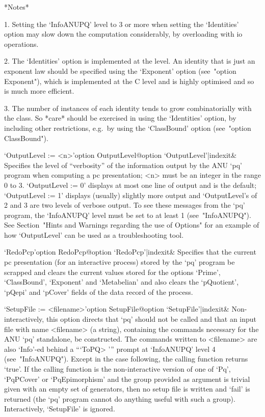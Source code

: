 *Notes*

\beginlist%

\item{1.}
Setting the `InfoANUPQ' level to 3 or more when setting the  `Identities'
option may slow down the computation considerably, by overloading  {\GAP}
with io operations.

\item{2.}
The `Identities' option is implemented at the {\GAP} level.  An  identity
that is just an exponent law should be  specified  using  the  `Exponent'
option (see~"option Exponent"), which is implemented at the C  level  and
is highly optimised and so is much more efficient.

\item{3.}
The  number  of   instances  of  each  identity   tends  to  grow
combinatorially with the class. So *care* should be exercised in using
the  `Identities'  option, by  including  other restrictions,  e.g.~by
using the `ClassBound' option (see~"option ClassBound").

\endlist

\>`OutputLevel := <n>'{option OutputLevel}@{option `OutputLevel'|indexit}&
Specifies the level of ``verbosity'' of the information output by the ANU
`pq' program when computing a pc presentation; <n> must be an integer  in
the range 0 to 3. `OutputLevel := 0' displays at most one line of  output
and is the default; `OutputLevel := 1' displays (usually)  slightly  more
output and `OutputLevel's of 2 and 3 are two levels of verbose output. To
see these messages from the `pq' program, the `InfoANUPQ' level  must  be
set to at least 1  (see~"InfoANUPQ").  See  Section~"Hints  and  Warnings
regarding the use of Options" for an example of how `OutputLevel' can  be
used as a troubleshooting tool.

\>`RedoPcp'{option RedoPcp}@{option `RedoPcp'|indexit}&
Specifies that the current pc presentation (for an  interactive  process)
stored by the `pq' program be scrapped  and  clears  the  current  values
stored for the options `Prime', `ClassBound', `Exponent' and `Metabelian'
and also clears the `pQuotient', `pQepi' and `pCover' fields of the  data
record of the process.

\>`SetupFile := <filename>'{option SetupFile}@{option `SetupFile'|indexit}&
Non-interactively, this option directs that `pq' should not be called and
that an input file  with  name  <filename>  (a  string),  containing  the
commands necessary for the  ANU  `pq'  standalone,  be  constructed.  The
commands written to <filename> are also `Info'-ed behind  a  ```ToPQ> '''
prompt at `InfoANUPQ' level  4  (see~"InfoANUPQ").  Except  in  the  case
following, the calling function returns `true'. If the  calling  function
is  the  non-interactive  version  of  one   of   `Pq',   `PqPCover'   or
`PqEpimorphism' and the group provided as argument is trivial given  with
an empty set of generators, then no setup file is written and  `fail'  is
returned (the `pq' program cannot do anything useful with such a  group).
Interactively, `SetupFile' is ignored.

